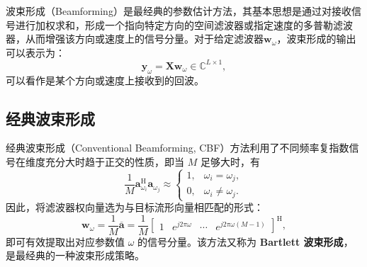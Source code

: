 波束形成（Beamforming）是最经典的参数估计方法，其基本思想是通过对接收信号进行加权求和，形成一个指向特定方向的空间滤波器或指定速度的多普勒滤波器，从而增强该方向或速度上的信号分量。对于给定滤波器\( \bm{w}_{\omega} \)，波束形成的输出可以表示为：
\[
    \bm{y}_{\omega} = \mathbf{X} \bm{w}_{\omega} \in \mathbb{C}^{L \times 1},
\]
可以看作是某个方向或速度上接收到的回波。

\subsection{经典波束形成}

经典波束形成（Conventional Beamforming, CBF）方法利用了不同频率复指数信号在维度充分大时趋于正交的性质，即当 $M$ 足够大时，有
\[
    \frac{1}{M}\bm{a}_{\omega_i}^{\mathrm{H}} \bm{a}_{\omega_j} \approx
    \begin{cases}
        1, & \omega_i = \omega_j,     \\
        0, & \omega_i \neq \omega_j .
    \end{cases}
\]
因此，将滤波器权向量选为与目标流形向量相匹配的形式：
\[
    \bm{w}_{\omega} = \frac{1}{M} \overline{\bm{a}}
    = \frac{1}{M} \begin{bmatrix}
        1 & e^{j 2 \pi \omega} & \cdots & e^{j 2 \pi \omega (M-1)}
    \end{bmatrix}^{\mathrm{H}},
\]
即可有效提取出对应参数值 $\omega$ 的信号分量。该方法又称为 \textbf{Bartlett 波束形成}，是最经典的一种波束形成策略。

